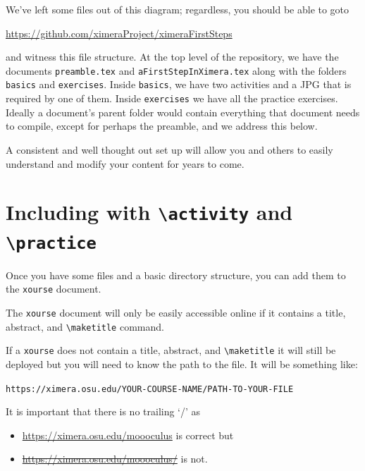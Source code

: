 \documentclass{ximera}
\begin{document}
We've left some files out of this diagram; regardless, you should be able to
goto
\begin{center}
  \url{https://github.com/ximeraProject/ximeraFirstSteps}
\end{center}
and witness this file structure. At the top level of the repository, we have
the documents \verb!preamble.tex! and \verb!aFirstStepInXimera.tex! along with
the folders \verb!basics! and \verb!exercises!. Inside \verb!basics!, we have
two activities and a JPG that is required by one of them. Inside
\verb!exercises!
we have all the practice exercises.
Ideally a document's parent folder would contain everything that document needs
to compile, except for perhaps the preamble, and we address this below.

A consistent and well thought out set up will allow you and others to easily
understand and modify your
content for years to come.

\section{Including with \texttt{\textbackslash activity} and
  \texttt{\textbackslash practice}}

Once you have some files and a basic directory structure, you can add them to
the \verb!xourse! document.

\begin{warning}
  The \verb!xourse! document will only be easily accessible online if it contains a title,
  abstract, and {\tt\textbackslash maketitle} command.

  If a \verb!xourse! does not contain a title, abstract, and {\tt\textbackslash maketitle} it will still be deployed but you will need to know the path to the file. It will be something like:
  \begin{center}
    \tt https://ximera.osu.edu/YOUR-COURSE-NAME/PATH-TO-YOUR-FILE
  \end{center}
  It is important that there is no trailing `/' as 
  \begin{itemize}
    \item \url{https://ximera.osu.edu/moooculus} is correct but 
    \item \sout{\url{https://ximera.osu.edu/moooculus/}} is not.
  \end{itemize}
\end{warning}
\end{document}
